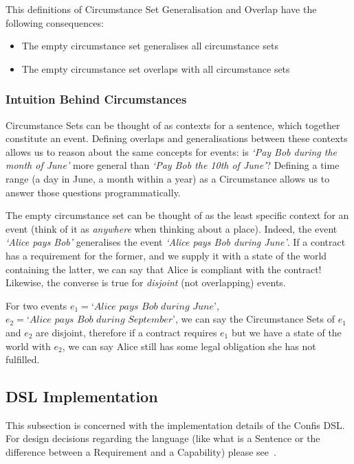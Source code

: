 This definitions of Circumstance Set Generalisation and Overlap have the following consequences:
\begin{itemize}
    \item The empty circumstance set generalises all circumstance sets
    \item The empty circumstance set overlaps with all circumstance sets
\end{itemize}

\subsubsection{Intuition Behind Circumstances}\label{subsubsec:circumstances-intuition}

Circumstance Sets can be thought of as contexts for a sentence, which together constitute an event.
Defining overlaps and generalisations between these contexts allows us to reason about the same concepts for events: is \emph{`Pay Bob during the month of June'} more general than \emph{`Pay Bob the 10th of June'}? Defining a time range (a day in June, a month within a year) as a Circumstance allows us to answer those questions programmatically.

The empty circumstance set can be thought of as the least specific context for an event (think of it as \emph{anywhere} when thinking about a place).
Indeed, the event \emph{`Alice pays Bob'} generalises the event \emph{`Alice pays Bob during June'}.
If a contract has a requirement for the former, and we supply it with a state of the world containing the latter, we can say that Alice is compliant with the contract!\\

Likewise, the converse is true for \emph{disjoint} (not overlapping) events.

For two events $e_1 = \textit{`Alice pays Bob during June'}$,  $e_2 = \textit{`Alice pays Bob during September'}$, we can say the Circumstance Sets of $e_1$ and $e_2$ are disjoint, therefore if a contract requires $e_1$ but we have a state of the world with $e_2$, we can say Alice still has some legal obligation she has not fulfilled.

\subsection{DSL Implementation}\label{subsec:dsl-implementation}

This subsection is concerned with the implementation details of the Confis DSL.
For design decisions regarding the language (like what is a Sentence or the difference between a Requirement and a Capability) please see~.

